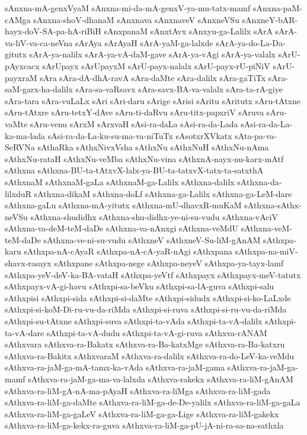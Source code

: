 {sAnxna-mA-genxVyaM
sAnxna-mi-da-mA-genxV-ya-mu-tatx-mamf
sAnxna-paM-cAMga
sAnxna-shoV-dhanaM
sAnxnava
sAnxnaveV
sAnxneVSu
sAnxneY-bAR-hayx-doV-SA-pa-hA-riBiH
sAnxpanaM
sAnxtAvx
sAnxyu-ga-Lalilx
sArA
sArA-va-liV-va-ca-neVna
sArAya
sArAyaH
sArA-yaM-ga-lalxde
sArA-ya-do-La-Da-gitutx
sArA-ya-nalilx
sArA-ya-vA-daM-gave
sArA-ya-vAgi
sArA-ya-valalx
sArU-pAyxcacx
sArUpayx
sArUpayxM
sArU-payx-nalalx
sArU-payx-rU-piNiV
sArU-payxraM
sAra
sAra-dA-dhA-ravA
sAra-daMte
sAra-dalilx
sAra-gaTiTx
sAra-saM-garx-ha-dalilx
sAra-sa-vaRsavx
sAra-savx-BA-va-valalx
sAra-ta-rA-giye
sAra-tara
sAra-vuLaLx
sAri
sAri-daru
sArige
sArisi
sAritu
sAritutx
sAru-tAtxne
sAru-tAtxre
sAru-tetxY-dAve
sAru-ti-daRvu
sAru-titx-papxriV
sAruva
sAru-vaMte
sAru-venu
sArxM
sArxvaH
sAsi-ra-daLa
sAsi-ra-da-Lada
sAsi-ra-da-La-ka-ma-lada
sAsi-ra-da-La-ku-su-ma-va-niTuTx
sAsotxrXVkatx
sAta-pa-va-SeRVNa
sAthaRka
sAthxNivxVsha
sAthxNu
sAthxNuH
sAthxNu-nAma
sAthxNu-rataH
sAthxNu-veMba
sAthxNu-vina
sAthxnA-nayx-nu-karx-mAtf
sAthxna
sAthxna-BU-ta-tAtxvX-lalx-ya-BU-ta-tatxvX-tatx-ta-satxthA
sAthxnaM
sAthxnaM-gaLa
sAthxnaM-ga-Lalilx
sAthxna-dalilx
sAthxna-da-lilxduR
sAthxna-dikaM
sAthxna-doLf
sAthxna-ga-Lalilx
sAthxna-ga-LeM-dare
sAthxna-gaLu
sAthxna-mA-yitutx
sAthxna-mU-dhavxR-muKaM
sAthxna-sAthx-neVSu
sAthxna-shudidhx
sAthxna-shu-didhx-ye-ni-su-vudu
sAthxna-vAciV
sAthxna-va-deM-teM-daDe
sAthxna-va-nAnxgi
sAthxna-veMdU
sAthxna-veM-teM-daDe
sAthxna-ve-ni-su-vudu
sAthxneV
sAthxneV-Su-liM-gAnAM
sAthxpa-karu
sAthxpa-nA-cAyaR
sAthxpa-nA-cA-yaR-nAgi
sAthxpana
sAthxpa-na-miV-shavx-rasayx
sAthxpane
sAthxpa-nege
sAthxpa-neyeV
sAthxpa-ya-tayx-lamf
sAthxpa-yeV-deV-ka-BA-vataH
sAthxpa-yeVtf
sAthxpayx
sAthxpayx-meV-tatutx
sAthxpayx-vA-gi-havu
sAthxpi-sa-beVku
sAthxpi-sa-lA-guva
sAthxpi-salu
sAthxpisi
sAthxpi-sida
sAthxpi-si-daMte
sAthxpi-sidudx
sAthxpi-si-ko-LaLxde
sAthxpi-si-koM-Di-ru-vu-da-riMda
sAthxpi-si-ruva
sAthxpi-si-ru-vu-da-riMda
sAthxpi-su-tAtxne
sAthxpi-suva
sAthxpi-ta-vAda
sAthxpi-ta-vA-dalilx
sAthxpi-ta-vA-dare
sAthxpi-ta-vA-dudu
sAthxpi-ta-vA-gi-ruva
sAthxva-rANAM
sAthxvara
sAthxva-ra-Bakatx
sAthxva-ra-Ba-katxMge
sAthxva-ra-Ba-katxru
sAthxva-ra-Bakitx
sAthxvaraM
sAthxva-ra-dalilx
sAthxva-ra-do-LeV-ka-veMdu
sAthxva-ra-jaM-ga-mA-tamx-ka-vAda
sAthxva-ra-jaM-gama
sAthxva-ra-jaM-ga-mamf
sAthxva-ra-jaM-ga-ma-va-lalxda
sAthxva-rakekx
sAthxva-ra-liM-gAnAM
sAthxva-ra-liM-gA-nA-ma-pAyaH
sAthxva-ra-liMga
sAthxva-ra-liM-gada
sAthxva-ra-liM-ga-daMte
sAthxva-ra-liM-ga-de-De-yalilx
sAthxva-ra-liM-ga-gaLa
sAthxva-ra-liM-ga-gaLeV
sAthxva-ra-liM-ga-ga-Lige
sAthxva-ra-liM-gakekx
sAthxva-ra-liM-ga-kekx-ra-guva
sAthxva-ra-liM-ga-pU-jA-ni-ra-sa-na-sathxla
}
